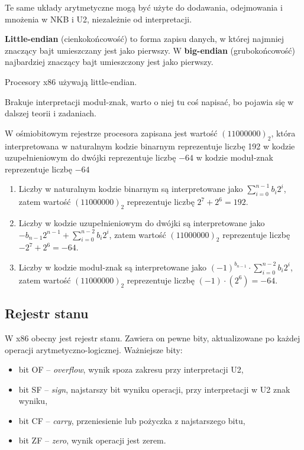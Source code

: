 Te same układy arytmetyczne mogą być użyte do dodawania, odejmowania i mnożenia w NKB i U2, niezależnie od interpretacji.

\textbf{Little-endian} (cienkokońcowość) to forma zapisu danych, w której najmniej znaczący bajt umieszczany jest jako pierwszy. W \textbf{big-endian} (grubokońcowość) najbardziej znaczący bajt umieszczony jest jako pierwszy.

Procesory x86 używają little-endian.

\begin{editorsnote}
    Brakuje interpretacji moduł-znak, warto o niej tu coś napisać, bo pojawia się w dalszej teorii i zadaniach.
\end{editorsnote}

\begin{exam}
    W ośmiobitowym rejestrze procesora zapisana jest wartość $(11000000)_2$, która interpretowana
    \answers
    {w naturalnym kodzie binarnym reprezentuje liczbę 192}
    {w kodzie uzupełnieniowym do dwójki reprezentuje liczbę $-64$}
    {w kodzie moduł-znak reprezentuje liczbę $-64$}
    \bigskip

    \begin{enumerate}[\bf A.]
        \item Liczby w naturalnym kodzie binarnym są interpretowane jako $\sum_{i = 0}^{n - 1} b_i 2^i$, zatem wartość $(11000000)_2$ reprezentuje liczbę $2^7 + 2^6 = 192$.

        \item Liczby w kodzie uzupełnieniowym do dwójki są interpretowane jako $-b_{n-1} 2^{n - 1} + \sum_{i = 0}^{n - 2} b_i 2^i$, zatem wartość $(11000000)_2$ reprezentuje liczbę $-2^7 + 2^6 = -64$.

        \item Liczby w kodzie moduł-znak są interpretowane jako $(-1)^{b_{n-1}} \cdot \sum_{i = 0}^{n - 2} b_i 2^i$, zatem wartość $(11000000)_2$ reprezentuje liczbę $(-1) \cdot (2^6) = -64$.
    \end{enumerate}
\end{exam}

\subsection{Rejestr stanu}

W x86 obecny jest rejestr stanu. Zawiera on pewne bity, aktualizowane po każdej operacji arytmetyczno-logicznej. Ważniejsze bity:
\begin{itemize}
    \item bit {\ttfamily OF} -- \textit{overflow}, wynik spoza zakresu przy interpretacji U2,
    \item bit {\ttfamily SF} -- \textit{sign}, najstarszy bit wyniku operacji, przy interpretacji w U2 znak wyniku,
    \item bit {\ttfamily CF}  -- \textit{carry}, przeniesienie lub pożyczka z najstarszego bitu,
    \item bit {\ttfamily ZF} -- \textit{zero}, wynik operacji jest zerem.
\end{itemize}

